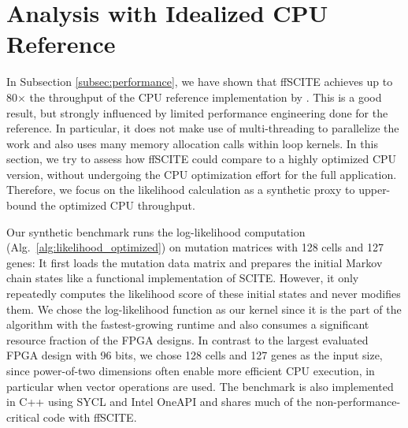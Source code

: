 \section{Analysis with Idealized CPU Reference}
\label{subsec:cpu}

In Subsection \ref{subsec:performance}, we have shown that \ac{ffSCITE} achieves up to 80$\times$ the throughput of the CPU reference implementation by \citeauthor{tree2016} \cite{tree2016}. 
This is a good result, but strongly influenced by limited performance engineering done for the reference.
In particular, it does not make use of multi-threading to parallelize the work and also uses many memory allocation calls within loop kernels. In this section, we try to assess how \ac{ffSCITE} could compare to a highly optimized CPU version, without undergoing the CPU optimization effort for the full application. Therefore, we focus on the likelihood calculation as a synthetic proxy to upper-bound the optimized CPU throughput.

Our synthetic benchmark runs the log-likelihood computation (Alg.~\ref{alg:likelihood_optimized}) on mutation matrices with 128 cells and 127 genes: It first loads the mutation data matrix and prepares the initial Markov chain states like a functional implementation of \ac{SCITE}. However, it only repeatedly computes the likelihood score of these initial states and never modifies them. 
We chose the log-likelihood function as our kernel since it is the part of the algorithm with the fastest-growing runtime and also consumes a significant resource fraction of the FPGA designs.
In contrast to the largest evaluated FPGA design with 96 bits, we chose 128 cells and 127 genes as the input size, since power-of-two dimensions often enable more efficient CPU execution, in particular when vector operations are used.
The benchmark is also implemented in C++ using SYCL and Intel OneAPI and shares much of the non-performance-critical code with \ac{ffSCITE}.

